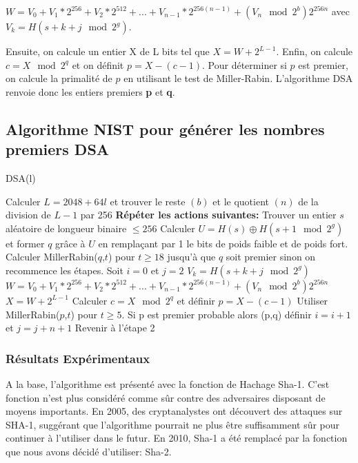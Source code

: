 $W=V_0 + V_1*2^{256} + V_2*2^{512} +...+V_{n-1}*2^{256(n-1)} + (V_n\mod 2^b)2^{256n}$ avec $V_k=H(s+k+j \mod 2^g)$. 

Ensuite, on calcule un entier X de L bits tel que $X=W+2^{L-1}$. Enfin, on calcule $c=X\mod2^q$ et on définit $p=X-(c-1)$. Pour déterminer si $p$ est premier, on calcule la primalité de $p$ en utilisant le test de Miller-Rabin.
L'algorithme DSA renvoie donc les entiers premiers \textbf{p} et \textbf{q}.

\subsection{Algorithme NIST pour générer les nombres premiers DSA}

\begin{algorithm}[h!]
\caption{DSA(l)}
\begin{algorithmic}[1]
\State Calculer $L=2048+64l$ et trouver le reste $(b)$ et le quotient $(n)$ de la division de $L-1$ par 256   
\State \textbf{Répéter les actions suivantes:}
\State Trouver un entier $s$ aléatoire de longueur binaire $ \leq 256$
\State Calculer $U=H(s) \oplus H(s+1 \mod 2^g)$ et former $q$ grâce à $U$ en remplaçant par 1 le bits de poids faible et de poids fort.
\State Calculer MillerRabin($q$,$t$) pour $t\geq18$ jusqu'à que $q$ soit premier sinon on recommence les étapes.
\State Soit $i=0$ et $j=2$
\State $V_k=H(s+k+j \mod 2^g)$ 
\State $W=V_0 + V_1*2^{256} + V_2*2^{512} +...+V_{n-1}*2^{256(n-1)} + (V_n\mod 2^b)2^{256n}$ 
\EndFor
\State $X=W+2^{L-1}$
\State Calculer $c=X\mod2^q$ et définir $p=X-(c-1)$
\State Utiliser MillerRabin($p$,$t$) pour $t\geq5$. 
\State Si p est premier probable alors \Return (p,q)
\EndIf
\State définir $i=i+1$ et $j=j+n+1$
\EndWhile
\State Revenir à l'étape 2
\end{algorithmic}
\end{algorithm}

\subsubsection{Résultats Expérimentaux}

A la base, l'algorithme est présenté avec la fonction de Hachage Sha-1. C'est fonction n'est plus considéré comme sûr contre des adversaires disposant de moyens importants. En 2005, des cryptanalystes ont découvert des attaques sur SHA-1, suggérant que l'algorithme pourrait ne plus être suffisamment sûr pour continuer à l'utiliser dans le futur. En 2010, Sha-1 a été remplacé par la fonction que nous avons décidé d'utiliser: Sha-2.

